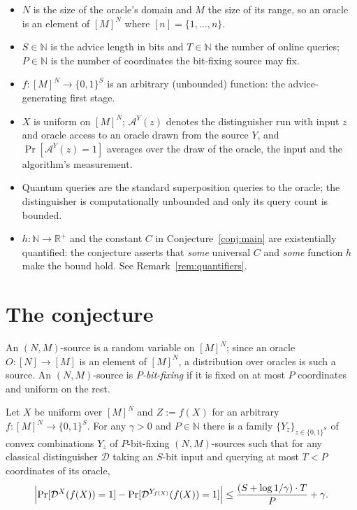 \documentclass{aicr-conjecture}
\newcommand{\Adv}{\mathcal{A}}
\newcommand{\Dist}{\mathcal{D}}
\newcommand{\Prb}{\Pr}
\newcommand{\bits}{\{0,1\}}
\begin{document}
\begin{itemize}
\item $N$ is the size of the oracle's domain and $M$ the size of its
  range, so an oracle is an element of $[M]^{N}$ where $[n] =
  \{1,\dots,n\}$.
\item $S \in \mathbb{N}$ is the advice length in bits and $T \in
  \mathbb{N}$ the number of online queries; $P \in \mathbb{N}$ is the
  number of coordinates the bit-fixing source may fix.
\item $f : [M]^{N} \to \bits^{S}$ is an arbitrary (unbounded)
  function: the advice-generating first stage.
\item $X$ is uniform on $[M]^{N}$; $\Adv^{Y}(z)$ denotes the
  distinguisher run with input $z$ and oracle access to an oracle drawn
  from the source $Y$, and $\Prb[\Adv^{Y}(z) = 1]$ averages over the
  draw of the oracle, the input and the algorithm's measurement.
\item Quantum queries are the standard superposition queries to the
  oracle; the distinguisher is computationally unbounded and only its
  query count is bounded.
\item $h : \mathbb{N} \to \mathbb{R}^{+}$ and the constant $C$ in
  Conjecture~\ref{conj:main} are existentially quantified: the
  conjecture asserts that \emph{some} universal $C$ and \emph{some}
  function $h$ make the bound hold. See Remark~\ref{rem:quantifiers}.
\end{itemize}

\section{The conjecture}\label{sec:conjectures}

\begin{definition}\label{def:source}
An $(N,M)$-source is a random variable on $[M]^{N}$; since an oracle
$O : [N] \to [M]$ is an element of $[M]^{N}$, a distribution over
oracles is such a source. An $(N,M)$-source is \emph{$P$-bit-fixing} if
it is fixed on at most $P$ coordinates and uniform on the rest.
\end{definition}

\begin{lemma}\label{lem:classical}
Let $X$ be uniform over $[M]^{N}$ and $Z := f(X)$ for an arbitrary
$f : [M]^{N} \to \bits^{S}$. For any $\gamma > 0$ and $P \in
\mathbb{N}$ there is a family $\{Y_{z}\}_{z \in \bits^{S}}$ of convex
combinations $Y_{z}$ of $P$-bit-fixing $(N,M)$-sources such that for
any classical distinguisher $\Dist$ taking an $S$-bit input and
querying at most $T < P$ coordinates of its oracle,
\[
  \Bigl|\Prb[\Dist^{X}(f(X)) = 1]
  - \Prb[\Dist^{Y_{f(X)}}(f(X)) = 1]\Bigr|
  \le \frac{(S + \log 1/\gamma)\cdot T}{P} + \gamma.
\]
\end{lemma}
\end{document}
